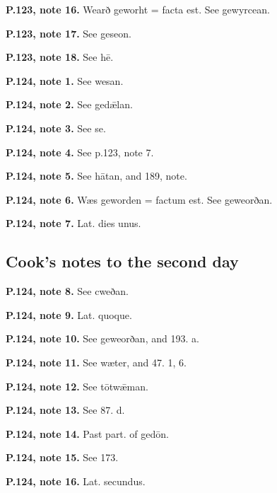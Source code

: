 \textbf{P.123, note 16.} Wearð geworht = facta est. See gewyrcean.

\textbf{P.123, note 17.} See geseon.

\textbf{P.123, note 18.} See hē.

\textbf{P.124, note 1.} See wesan.

\textbf{P.124, note 2.} See gedǣlan.

\textbf{P.124, note 3.} See se.

\textbf{P.124, note 4.} See p.123, note 7.

\textbf{P.124, note 5.} See hātan, and 189, note.

\textbf{P.124, note 6.} Wæs geworden = factum est. See geweorðan.

\textbf{P.124, note 7.} Lat. dies unus.

\subsection*{Cook’s notes to the second day}

\textbf{P.124, note 8.} See cweðan.

\textbf{P.124, note 9.} Lat. quoque.

\textbf{P.124, note 10.} See geweorðan, and 193. a.

\textbf{P.124, note 11.} See wæter, and 47. 1, 6.

\textbf{P.124, note 12.} See tōtwǣman.

\textbf{P.124, note 13.} See 87. d.

\textbf{P.124, note 14.} Past part. of gedōn.

\textbf{P.124, note 15.} See 173.

\textbf{P.124, note 16.} Lat. secundus.

\endgroup

